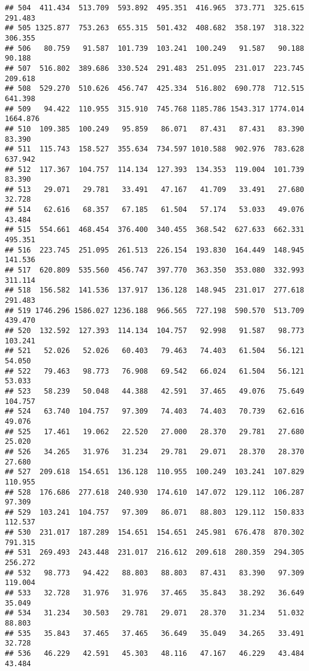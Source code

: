 \documentclass[
]{article}
\begin{document}
\begin{verbatim}
## 504  411.434  513.709  593.892  495.351  416.965  373.771  325.615  291.483
## 505 1325.877  753.263  655.315  501.432  408.682  358.197  318.322  306.355
## 506   80.759   91.587  101.739  103.241  100.249   91.587   90.188   90.188
## 507  516.802  389.686  330.524  291.483  251.095  231.017  223.745  209.618
## 508  529.270  510.626  456.747  425.334  516.802  690.778  712.515  641.398
## 509   94.422  110.955  315.910  745.768 1185.786 1543.317 1774.014 1664.876
## 510  109.385  100.249   95.859   86.071   87.431   87.431   83.390   83.390
## 511  115.743  158.527  355.634  734.597 1010.588  902.976  783.628  637.942
## 512  117.367  104.757  114.134  127.393  134.353  119.004  101.739   83.390
## 513   29.071   29.781   33.491   47.167   41.709   33.491   27.680   32.728
## 514   62.616   68.357   67.185   61.504   57.174   53.033   49.076   43.484
## 515  554.661  468.454  376.400  340.455  368.542  627.633  662.331  495.351
## 516  223.745  251.095  261.513  226.154  193.830  164.449  148.945  141.536
## 517  620.809  535.560  456.747  397.770  363.350  353.080  332.993  311.114
## 518  156.582  141.536  137.917  136.128  148.945  231.017  277.618  291.483
## 519 1746.296 1586.027 1236.188  966.565  727.198  590.570  513.709  439.470
## 520  132.592  127.393  114.134  104.757   92.998   91.587   98.773  103.241
## 521   52.026   52.026   60.403   79.463   74.403   61.504   56.121   54.050
## 522   79.463   98.773   76.908   69.542   66.024   61.504   56.121   53.033
## 523   58.239   50.048   44.388   42.591   37.465   49.076   75.649  104.757
## 524   63.740  104.757   97.309   74.403   74.403   70.739   62.616   49.076
## 525   17.461   19.062   22.520   27.000   28.370   29.781   27.680   25.020
## 526   34.265   31.976   31.234   29.781   29.071   28.370   28.370   27.680
## 527  209.618  154.651  136.128  110.955  100.249  103.241  107.829  110.955
## 528  176.686  277.618  240.930  174.610  147.072  129.112  106.287   97.309
## 529  103.241  104.757   97.309   86.071   88.803  129.112  150.833  112.537
## 530  231.017  187.289  154.651  154.651  245.981  676.478  870.302  791.315
## 531  269.493  243.448  231.017  216.612  209.618  280.359  294.305  256.272
## 532   98.773   94.422   88.803   88.803   87.431   83.390   97.309  119.004
## 533   32.728   31.976   31.976   37.465   35.843   38.292   36.649   35.049
## 534   31.234   30.503   29.781   29.071   28.370   31.234   51.032   88.803
## 535   35.843   37.465   37.465   36.649   35.049   34.265   33.491   32.728
## 536   46.229   42.591   45.303   48.116   47.167   46.229   43.484   43.484

\end{verbatim}
\end{document}
